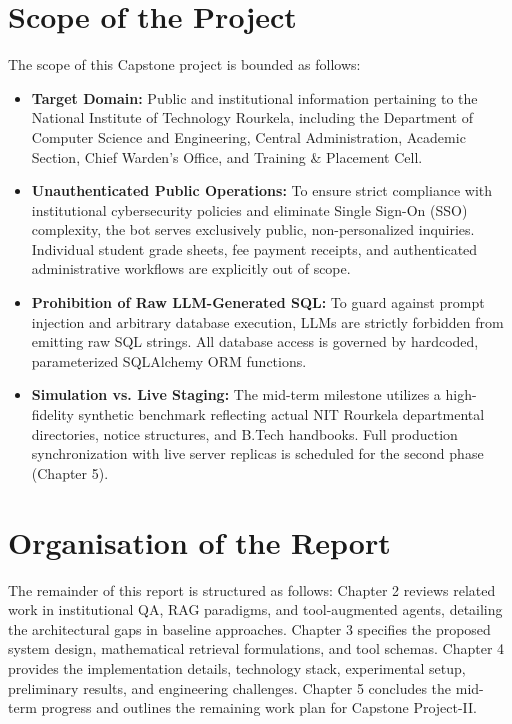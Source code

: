 \documentclass[12pt,a4paper]{report}
\begin{document}
\section{Scope of the Project}
The scope of this Capstone project is bounded as follows:
\begin{itemize}
    \item \textbf{Target Domain:} Public and institutional information pertaining to the National Institute of Technology Rourkela, including the Department of Computer Science and Engineering, Central Administration, Academic Section, Chief Warden's Office, and Training \& Placement Cell.
    \item \textbf{Unauthenticated Public Operations:} To ensure strict compliance with institutional cybersecurity policies and eliminate Single Sign-On (SSO) complexity, the bot serves exclusively public, non-personalized inquiries. Individual student grade sheets, fee payment receipts, and authenticated administrative workflows are explicitly out of scope.
    \item \textbf{Prohibition of Raw LLM-Generated SQL:} To guard against prompt injection and arbitrary database execution, LLMs are strictly forbidden from emitting raw SQL strings. All database access is governed by hardcoded, parameterized SQLAlchemy ORM functions.
    \item \textbf{Simulation vs. Live Staging:} The mid-term milestone utilizes a high-fidelity synthetic benchmark reflecting actual NIT Rourkela departmental directories, notice structures, and B.Tech handbooks. Full production synchronization with live server replicas is scheduled for the second phase (Chapter 5).
\end{itemize}

\section{Organisation of the Report}
The remainder of this report is structured as follows: Chapter 2 reviews related work in institutional QA, RAG paradigms, and tool-augmented agents, detailing the architectural gaps in baseline approaches. Chapter 3 specifies the proposed system design, mathematical retrieval formulations, and tool schemas. Chapter 4 provides the implementation details, technology stack, experimental setup, preliminary results, and engineering challenges. Chapter 5 concludes the mid-term progress and outlines the remaining work plan for Capstone Project-II.

\end{document}
